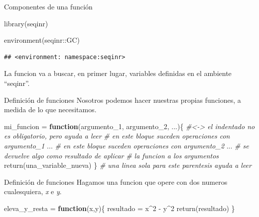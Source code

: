 \documentclass[
  10pt,
  ignorenonframetext,
]{beamer}
\newenvironment{Shaded}{\begin{snugshade}}{\end{snugshade}}
\newcommand{\CommentTok}[1]{\textcolor[rgb]{0.56,0.35,0.01}{\textit{#1}}}
\newcommand{\ControlFlowTok}[1]{\textcolor[rgb]{0.13,0.29,0.53}{\textbf{#1}}}
\newcommand{\DecValTok}[1]{\textcolor[rgb]{0.00,0.00,0.81}{#1}}
\newcommand{\FunctionTok}[1]{\textcolor[rgb]{0.00,0.00,0.00}{#1}}
\newcommand{\NormalTok}[1]{#1}
\newcommand{\OtherTok}[1]{\textcolor[rgb]{0.56,0.35,0.01}{#1}}
\newcommand{\SpecialCharTok}[1]{\textcolor[rgb]{0.00,0.00,0.00}{#1}}
\begin{document}
\begin{frame}[fragile]{Componentes de una función}
\protect\hypertarget{componentes-de-una-funciuxf3n-3}{}
\begin{Shaded}
\begin{Highlighting}[]
\FunctionTok{library}\NormalTok{(seqinr)}

\FunctionTok{environment}\NormalTok{(seqinr}\SpecialCharTok{::}\NormalTok{GC)}
\end{Highlighting}
\end{Shaded}

\begin{verbatim}
## <environment: namespace:seqinr>
\end{verbatim}

La funcion va a buscar, en primer lugar, variables definidas en el
ambiente ``seqinr''.
\end{frame}

\begin{frame}[fragile]{Definición de funciones}
\protect\hypertarget{definiciuxf3n-de-funciones}{}
Nosotros podemos hacer nuestras propias funciones, a medida de lo que
necesitamos. \vspace{15pt}

\begin{Shaded}
\begin{Highlighting}[]
\NormalTok{mi\_funcion }\OtherTok{=} \ControlFlowTok{function}\NormalTok{(argumento\_1, argumento\_2, ...)\{}
\CommentTok{\#\textless{}{-}\textgreater{} el indentado no es obligatorio, pero ayuda a leer  }
  \CommentTok{\# en este bloque suceden operaciones con argumento\_1}
\NormalTok{  ...}
  \CommentTok{\# en este bloque suceden operaciones con argumento\_2}
\NormalTok{  ...}
  \CommentTok{\# se devuelve algo como resultado de aplicar}
  \CommentTok{\# la funcion a los argumentos}
  \FunctionTok{return}\NormalTok{(una\_variable\_nueva) }
\NormalTok{\} }\CommentTok{\# una linea sola para este parentesis ayuda a leer}
\end{Highlighting}
\end{Shaded}
\end{frame}

\begin{frame}[fragile]{Definición de funciones}
\protect\hypertarget{definiciuxf3n-de-funciones-1}{}
Hagamos una funcion que opere con dos numeros cualesquiera, \emph{x} e
\emph{y}. \vspace{15pt}

\begin{Shaded}
\begin{Highlighting}[]
\NormalTok{eleva\_y\_resta }\OtherTok{=} \ControlFlowTok{function}\NormalTok{(x,y)\{}
\NormalTok{  resultado }\OtherTok{=}\NormalTok{ x}\SpecialCharTok{\^{}}\DecValTok{2} \SpecialCharTok{{-}}\NormalTok{ y}\SpecialCharTok{\^{}}\DecValTok{2}
  \FunctionTok{return}\NormalTok{(resultado)}
\NormalTok{\}}
\end{Highlighting}
\end{Shaded}
\end{frame}
\end{document}
